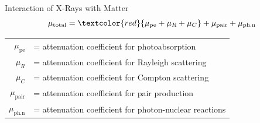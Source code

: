 
\begin{frame}{Interaction of X-Rays with Matter}
    \begin{eqnarray}
        \mu_\text{total} = \textcolor{red}{\mu_\text{pe} + \mu_{R} + \mu_{C}} + \mu_\text{pair} + \mu_\text{ph.n}
    \end{eqnarray}

    \begin{table}[t]
        \centering
        \begin{tabular}{r l}
            $\mu_\text{pe}$   & = attenuation coefficient for photoabsorption          \\
            $\mu_{R}$         & = attenuation coefficient for Rayleigh scattering      \\
            $\mu_{C}$         & = attenuation coefficient for Compton scattering       \\
            $\mu_\text{pair}$ & = attenuation coefficient for pair production          \\
            $\mu_\text{ph.n}$ & = attenuation coefficient for photon-nuclear reactions \\
        \end{tabular}
    \end{table}
\end{frame}


